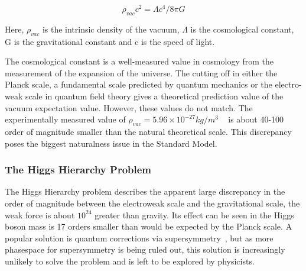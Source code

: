 \begin{equation}
    \rho_{vac}c^2=\Lambda c^4/8\pi G
\label{eq:cosmoconst}
\end{equation}

Here, $\rho_{vac}$ is the intrinsic density of the vacuum, $\Lambda$ is the cosmological constant, G is the gravitational constant and c is the speed of light. 

The cosmological constant is a well-measured value in cosmology from the measurement of the expansion of the universe. The cutting off in either the Planck scale, a fundamental scale predicted by quantum mechanics or the electro-weak scale in quantum field theory gives a theoretical prediction value of the vacuum expectation value. However, these values do not match. The experimentally measured value of $\rho_{vac}= 5.96 \times 10^{-27} kg/m^{3}$ ~\cite{2016Planck} is about 40-100 order of magnitude smaller than the natural theoretical scale.
This discrepancy poses the biggest naturalness issue in the Standard Model.





\subsubsection{The Higgs Hierarchy Problem}
The Higgs Hierarchy problem describes the apparent large discrepancy in the order of magnitude between the electroweak scale and the gravitational scale, the weak force is about $10^{24}$ greater than gravity. Its effect can be seen in the Higgs boson mass is 17 orders smaller than would be expected by the Planck scale.
A popular solution is quantum corrections via supersymmetry~\cite{2018SUSY}, but as more phasespace for supersymmetry is being ruled out, this solution is increasingly unlikely to solve the problem and is left to be explored by physicists.


